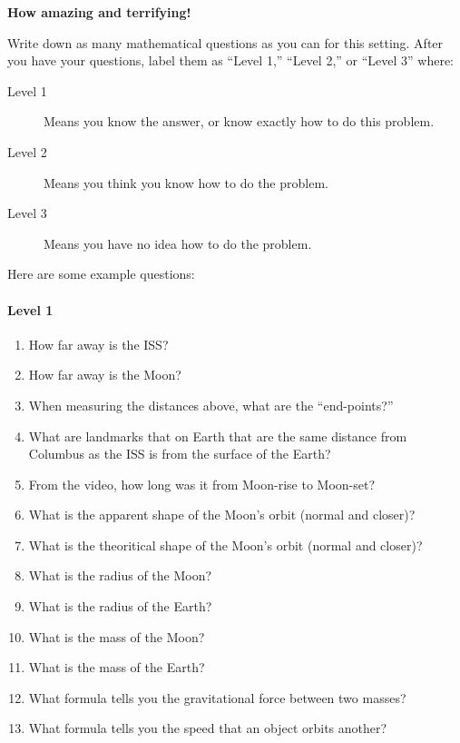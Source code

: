 \documentclass{ximera}
\begin{document}
\begin{center}
\textbf{How amazing and terrifying!}
\end{center}
\begin{problem}
     Write down as many mathematical questions as you can for this
     setting. After you have your questions, label them as ``Level
     1,'' ``Level 2,'' or ``Level 3'' where:
\begin{description}
\item[Level 1] Means you know the answer, or know exactly how to do
  this problem.
\item[Level 2] Means you think you know how to do the problem.
\item[Level 3] Means you have no idea how to do the problem.
\end{description}
\begin{freeResponse}
  Here are some example questions:
  \paragraph{Level 1}
  \begin{enumerate}
  \item How far away is the ISS?
  \item How far away is the Moon?
  \item When measuring the distances above, what are the ``end-points?''
  \item What are landmarks that on Earth that are the same distance
    from Columbus as the ISS is from the surface of the Earth?
  \item From the video, how long was it from Moon-rise to Moon-set?
  \item What is the apparent shape of the Moon's orbit (normal and
    closer)?
  \item What is the theoritical shape of the Moon's orbit (normal and
    closer)?
  \item What is the radius of the Moon?
  \item What is the radius of the Earth?
  \item What is the mass of the Moon?
  \item What is the mass of the Earth?
  \item What formula tells you the gravitational force between two
    masses?
  \item What formula tells you the speed that an object orbits another?
  \end{enumerate}


\end{freeResponse}
\end{problem}
\end{document}
